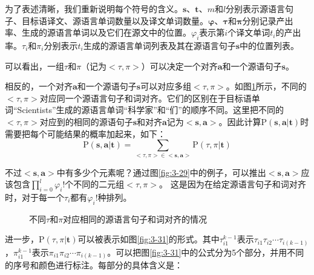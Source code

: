 \parinterval 为了表述清晰，我们重新说明每个符号的含义。$\mathbf{s}$、$\mathbf{t}$、$m$和$l$分别表示源语言句子、目标语译文、源语言单词数量以及译文单词数量。$\mathbf{\varphi}$、$\mathbf{\tau}$和$\mathbf{\pi}$分别记录产出率、生成的源语言单词以及它们在源文中的位置。${\varphi}_{i}$表示第$i$个译文单词$t_i$的产出率。${\tau}_{i}$和${\pi}_i$分别表示$t_i$生成的源语言单词列表及其在源语言句子$\mathbf{s}$中的位置列表。

\parinterval 可以看出，一组$\tau$和$\pi$（记为$<\tau,\pi>$）可以决定一个对齐$\mathbf{a}$和一个源语句子$\mathbf{s}$。

\noindent 相反的，一个对齐$\mathbf{a}$和一个源语句子$\mathbf{s}$可以对应多组$<\tau,\pi>$。如图\ref{fig:3-30}所示，不同的$<\tau,\pi>$对应同一个源语言句子和词对齐。它们的区别在于目标语单词``Scientists''生成的源语言单词``科学家''和``们''的顺序不同。这里把不同的$<\tau,\pi>$对应到的相同的源语句子$\mathbf{s}$和对齐$\mathbf{a}$记为$<\mathbf{s},\mathbf{a}>$。因此计算$\textrm{P}(\mathbf{s},\mathbf{a}| \mathbf{t})$时需要把每个可能结果的概率加起来，如下：
\begin{equation}
\textrm{P}(\mathbf{s},\mathbf{a}| \mathbf{t})=\sum_{{<\tau,\pi>}\in{<\mathbf{s},\mathbf{a}>}}{\textrm{P}(\tau,\pi|\mathbf{t}) }
\label{eq:3-66}
\end{equation}

\parinterval 不过$<\mathbf{s},\mathbf{a}>$中有多少个元素呢？通过图\ref{fig:3-29}中的例子，可以推出$<\mathbf{s},\mathbf{a}>$应该包含$\prod_{i=0}^{l}{\varphi_i !}$个不同的二元组$<\tau,\pi>$。 这是因为在给定源语言句子和词对齐时，对于每一个$\tau_i$都有$\varphi_{i}!$种排列。

\begin{figure}[htp]
    \centering

   \caption{不同$\tau$和$\pi$对应相同的源语言句子和词对齐的情况}
   \label{fig:3-30}
\end{figure}

\parinterval 进一步，$\textrm{P}(\tau,\pi|\mathbf{t})$可以被表示如图\ref{fig:3-31}的形式。其中$\tau_{i1}^{k-1}$表示$\tau_{i1}\tau_{i2}\cdots \tau_{i(k-1)}$，$\pi_{i1}^{ k-1}$表示$\pi_{i1}\pi_{i2}\cdots \pi_{i(k-1)}$。可以把图\ref{fig:3-31}中的公式分为5个部分，并用不同的序号和颜色进行标注。每部分的具体含义是：

